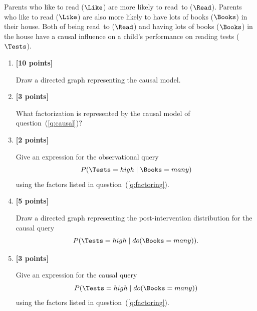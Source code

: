 \documentclass{article}
\newcounter{totalpoints}
\newcommand{\points}[1]{{\addtocounter{totalpoints}{#1}\textbf{[#1 points]}}}
\begin{document}
\begin{enumerate}
Parents who {like to read} ($\Like$) are more likely to {read~to} ($\Read$).
Parents who {like to read} ($\Like$) are also more likely to have lots of {books} ($\Books$) in their house.
Both of being {read~to} ($\Read$) and having lots of {books} ($\Books$) in the house have a causal influence on a child's performance on reading {tests} ($\Tests$).

\begin{enumerate}
    \item \points{10} \label{q:causal}
    Draw a directed graph representing the causal model.
    
    \begin{answer}{2in}
    \end{answer}

    \item \points{3} \label{q:factoring}
    What factorization is represented by the causal model of question~(\ref{q:causal})?

    \begin{answer}{.5in}
    \end{answer}
    
    \item \points{2}
    Give an expression for the observational query
    \[P(\Tests=high \mid \Books=many)\]
    using the factors listed in question~(\ref{q:factoring}).

    \begin{answer}{1in}
    \end{answer}

    \item \points{5} \label{q:post-intervention}
    Draw a directed graph representing the post-intervention distribution for the causal query
    \[P(\Tests=high \mid do(\Books=many)).\]

    \begin{answer}{2in}
    \end{answer}

    \item \points{3}
    Give an expression for the causal query
    \[P(\Tests=high \mid do(\Books=many))\]
    using the factors listed in question~(\ref{q:factoring}).

    \begin{answer}{1in}
    \end{answer}

\end{enumerate}

\end{enumerate}
\end{document}
